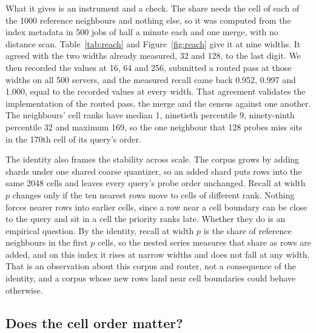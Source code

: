 \documentclass[sigconf, nonacm]{acmart}
\begin{document}
What it gives is an instrument and a check. The share needs the cell of each of the 1000 reference
neighbours and nothing else, so it was computed from the index metadata in 500 jobs of half a
minute each and one merge, with no distance scan. Table~\ref{tab:reach} and
Figure~\ref{fig:reach} give it at nine widths. It agreed with the two widths already measured, 32
and 128, to the last digit. We then recorded the values at 16, 64 and 256, submitted a routed pass
at those widths on all 500 servers, and the measured recall came back 0.952, 0.997 and 1.000, equal
to the recorded values at every width. That agreement validates the implementation of the routed
pass, the merge and the census against one another. The neighbours' cell ranks have median 1,
ninetieth percentile 9, ninety-ninth percentile 32 and maximum 169, so the one neighbour that 128
probes miss sits in the 170th cell of its query's order.

The identity also frames the stability across scale. The corpus grows by adding shards under one
shared coarse quantizer, so an added shard puts rows into the same 2048 cells and leaves every
query's probe order unchanged. Recall at width $p$ changes only if the ten nearest rows move to
cells of different rank. Nothing forces nearer rows into earlier cells, since a row near a cell
boundary can be close to the query and sit in a cell the priority ranks late. Whether they do is an
empirical question. By the identity, recall at width $p$ is the share of reference neighbours in
the first $p$ cells, so the nested series measures that share as rows are added, and on this index
it rises at narrow widths and does not fall at any width. That is an observation about this corpus
and router, not a consequence of the identity, and a corpus whose new rows land near cell
boundaries could behave otherwise.

\subsection{Does the cell order matter?}
\label{sec:order}
\end{document}
